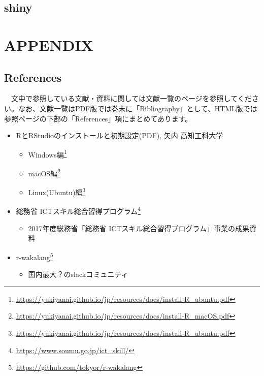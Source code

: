 \documentclass[
  12pt,
]{book}
\DeclareRobustCommand{\href}[2]{#2\footnote{\url{#1}}}
\providecommand{\tightlist}{%
  \setlength{\itemsep}{0pt}\setlength{\parskip}{0pt}}
\begin{document}
\hypertarget{shiny}{%
\chapter{shiny}\label{shiny}}

\hypertarget{part-appendix}{%
\part{APPENDIX}\label{part-appendix}}

\hypertarget{appendix-appendix}{%
\appendix {}}


\hypertarget{references}{%
\chapter{References}\label{references}}

　文中で参照している文献・資料に関しては文献一覧のページを参照してください。なお、文献一覧はPDF版では巻末に「Bibliography」として、HTML版では参照ページの下部の「References」項にまとめてあります。

\begin{itemize}
\tightlist
\item
  RとRStudioのインストールと初期設定(PDF), 矢内 高知工科大学

  \begin{itemize}
  \tightlist
  \item
    \href{https://yukiyanai.github.io/jp/resources/docs/install-R_ubuntu.pdf}{Windows編}
  \item
    \href{https://yukiyanai.github.io/jp/resources/docs/install-R_macOS.pdf}{macOS編}
  \item
    \href{https://yukiyanai.github.io/jp/resources/docs/install-R_ubuntu.pdf}{Linux(Ubuntu)編}
  \end{itemize}
\item
  \href{https://www.soumu.go.jp/ict_skill/}{総務省 ICTスキル総合習得プログラム}

  \begin{itemize}
  \tightlist
  \item
    2017年度総務省「総務省 ICTスキル総合習得プログラム」事業の成果資料
  \end{itemize}
\item
  \href{https://github.com/tokyor/r-wakalang}{r-wakalang}

  \begin{itemize}
  \tightlist
  \item
    国内最大？のslackコミュニティ
  \end{itemize}
\end{itemize}
\end{document}
